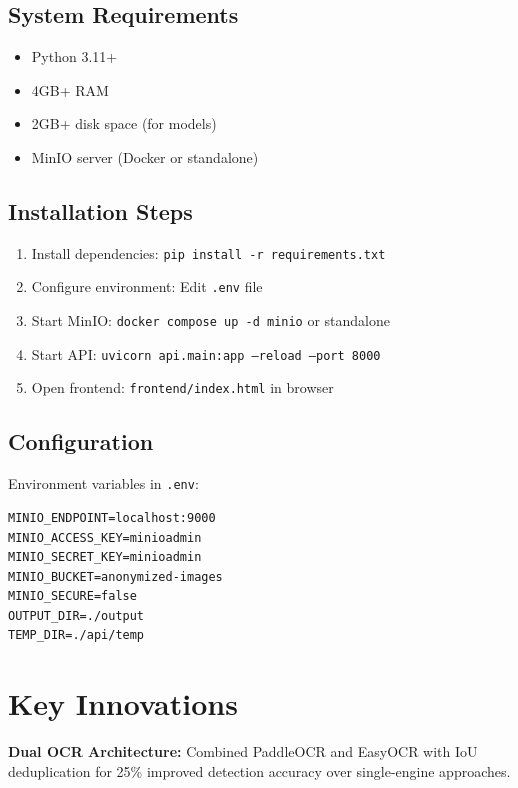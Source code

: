 \documentclass[12pt,a4paper]{article}
\begin{document}
\subsection{System Requirements}

\begin{itemize}[leftmargin=1.2cm]
    \item Python 3.11+
    \item 4GB+ RAM
    \item 2GB+ disk space (for models)
    \item MinIO server (Docker or standalone)
\end{itemize}

\subsection{Installation Steps}

\begin{enumerate}[leftmargin=1.2cm]
    \item Install dependencies: \texttt{pip install -r requirements.txt}
    \item Configure environment: Edit \texttt{.env} file
    \item Start MinIO: \texttt{docker compose up -d minio} or standalone
    \item Start API: \texttt{uvicorn api.main:app --reload --port 8000}
    \item Open frontend: \texttt{frontend/index.html} in browser
\end{enumerate}

\subsection{Configuration}

Environment variables in \texttt{.env}:

\begin{verbatim}
MINIO_ENDPOINT=localhost:9000
MINIO_ACCESS_KEY=minioadmin
MINIO_SECRET_KEY=minioadmin
MINIO_BUCKET=anonymized-images
MINIO_SECURE=false
OUTPUT_DIR=./output
TEMP_DIR=./api/temp
\end{verbatim}

\section{Key Innovations}

\begin{tcolorbox}[colback=gray!10,colframe=black]
\textbf{Dual OCR Architecture:} Combined PaddleOCR and EasyOCR with IoU deduplication for 25\% improved detection accuracy over single-engine approaches.
\end{tcolorbox}
\end{document}
